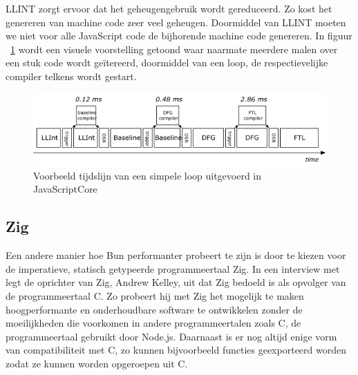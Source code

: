 LLINT zorgt ervoor dat het geheugengebruik wordt gereduceerd. Zo kost het genereren van machine code zeer veel geheugen.
Doormiddel van LLINT moeten we niet voor alle JavaScript code de bijhorende machine code genereren.
In figuur ~\ref{fig:JavaScriptcore} wordt een visuele voorstelling getoond 
waar naarmate meerdere malen over een stuk code wordt geïtereerd, doormiddel van een loop, de respectievelijke compiler telkens wordt gestart.
\begin{figure}[H]
    \centering
    \includegraphics[width=.9\textwidth]{graphics/javascriptcore.png}
    \caption{\label{fig:JavaScriptcore}Voorbeeld tijdslijn van een simpele loop uitgevoerd in JavaScriptCore ~\autocite{Pizlo2020}}
\end{figure}

\subsection{Zig}
Een andere manier hoe Bun performanter probeert te zijn is door te kiezen voor de imperatieve, statisch getypeerde programmeertaal Zig. 
In een interview met ~\textcite{Motroc2017} legt de oprichter van Zig, Andrew Kelley, uit dat Zig bedoeld is als opvolger van de programmeertaal C.
Zo probeert hij met Zig het mogelijk te maken hoogperformante en onderhoudbare software te ontwikkelen 
zonder de moeilijkheden die voorkomen in andere programmeertalen zoals C, de programmeertaal gebruikt door Node.js.
Daarnaast is er nog altijd enige vorm van compatibiliteit met C, 
zo kunnen bijvoorbeeld functies geexporteerd worden zodat ze kunnen worden opgeroepen uit C.

